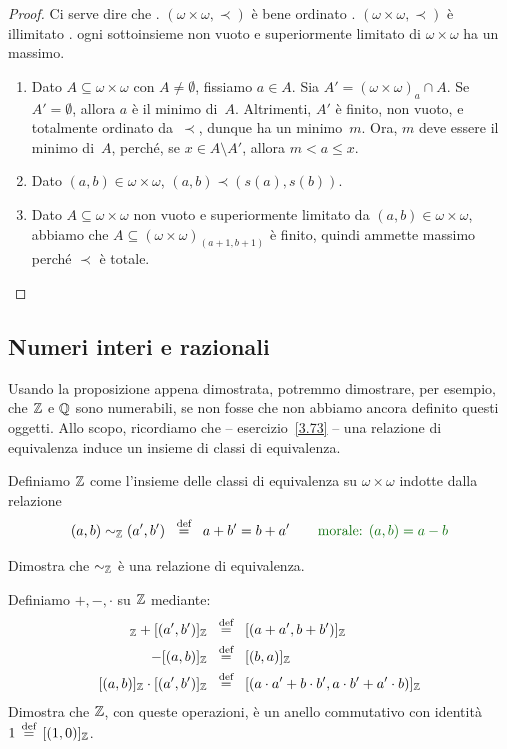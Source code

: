 \begin{proof}
	Ci serve dire che {.} $(\omega \times \omega, \prec)$ \`e
bene ordinato {.} $(\omega \times \omega, \prec)$ \`e illimitato
{.} ogni sottoinsieme non vuoto e superiormente limitato di $\omega \times \omega$ ha un massimo.

	\begin{enumerate}[1.]
		\item Dato $A \subseteq \omega \times \omega$ con $A \ne
\emptyset$, fissiamo $a \in A$. Sia $A' = (\omega \times \omega)_a \cap
A$. Se $A'=\emptyset$, allora $a$ \`e il minimo di~$A$. Altrimenti, $A'$
\`e finito, non vuoto, e totalmente ordinato da~$\prec$, dunque ha un
minimo~$m$. Ora, $m$ deve essere il minimo di~$A$, perch\'e, se $x \in A
\setminus A'$, allora $m < a \leq x$.
		\item Dato $(a,b) \in \omega \times \omega$, $(a,b) \prec
(s(a),s(b))$.
		\item Dato $A \subseteq \omega \times \omega$ non vuoto e
superiormente limitato da $(a,b) \in \omega \times \omega$, abbiamo che $A
\subseteq (\omega \times \omega)_{(a+1,b+1)}$ \`e finito, quindi ammette
massimo perch\'e $\prec$ \`e totale.
	\end{enumerate}
\end{proof}

\subsection{Numeri interi e razionali}
Usando la proposizione appena dimostrata, potremmo dimostrare, per
esempio, che $\ZZ$ e $\mathbb Q$ sono numerabili, se non fosse che non abbiamo
ancora definito questi oggetti. Allo scopo, ricordiamo che --
esercizio~\ref{3.73} -- una relazione di equivalenza
induce un insieme di classi di equivalenza.

\begin{definition}[$\ZZ$]
	Definiamo $\ZZ$ come l'insieme delle classi di equivalenza su $\omega \times \omega$ indotte dalla relazione
	\[ (a,b) \sim_\ZZ (a',b') \;\;\Mydef\;\; a + b' = b + a' \qquad
\text{\drkgrn morale: $(a,b) = a - b$}
		\]
\end{definition}

\begin{exercise}
	Dimostra che $\sim_\mathbb Z$ \`e una relazione di equivalenza.
\end{exercise}

\begin{exercise}
	Definiamo $+,-,\cdot$ su $\ZZ$ mediante:
	\begin{align*}
		[(a,b)]_\ZZ + [(a',b')]_\ZZ \;\;&\Mydef\;\; [(a+a',b+b')]_\ZZ \\
		-[(a,b)]_\ZZ \;\;&\Mydef\;\; [(b,a)]_\ZZ \\
		[(a,b)]_\ZZ \cdot [(a',b')]_\ZZ \;\;&\Mydef\;\; [(a\cdot a' + b \cdot b', a \cdot b' + a' \cdot b)]_{\ZZ}
	\end{align*}
	Dimostra che $\ZZ$, con queste operazioni, \`e un anello
commutativo con identit\`a~$1 \,\overset{\text{def}}{=}\, [(1,0)]_\mathbb Z$. 
\end{exercise}

